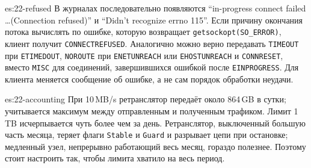 \begin{soluzione}{es:22-refused}
В журналах последовательно появляются \enquote{in-progress connect failed \ldots (Connection refused)} и \enquote{Didn't recognize errno 115}. Если причину окончания потока вычислять по ошибке, которую возвращает \texttt{getsockopt(SO\_ERROR)}, клиент получит \texttt{CONNECTREFUSED}. Аналогично можно верно передавать \texttt{TIMEOUT} при \texttt{ETIMEDOUT}, \texttt{NOROUTE} при \texttt{ENETUNREACH} или \texttt{EHOSTUNREACH} и \texttt{CONNRESET}, вместо \texttt{MISC} для соединений, завершившихся ошибкой после \texttt{EINPROGRESS}. Для клиента меняется сообщение об ошибке, а не сам порядок обработки неудачи.
\end{soluzione}

\begin{soluzione}{es:22-accounting}
При 10\,MB/s ретранслятор передаёт около 864\,GB в сутки; учитывается максимум между отправленным и полученным трафиком. Лимит 1\,TB исчерпывается чуть более чем за день. Ретранслятор, выключенный большую часть месяца, теряет флаги \texttt{Stable} и \texttt{Guard} и разрывает цепи при остановке; медленный узел, непрерывно работающий весь месяц, гораздо полезнее. Поэтому  стоит настроить так, чтобы лимита хватило на весь период.
\end{soluzione}
